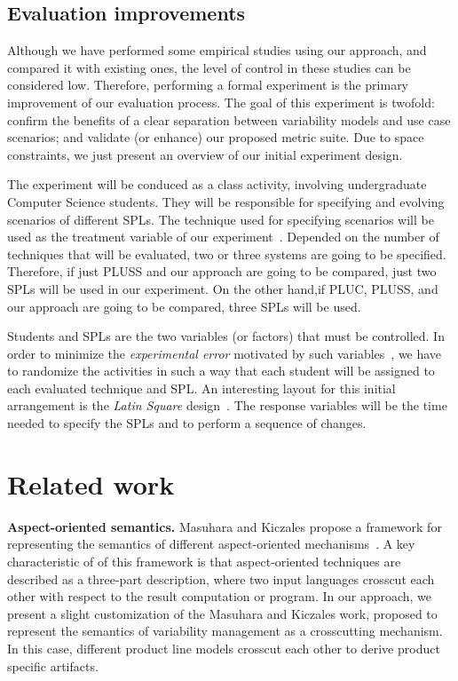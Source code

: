 \documentclass[times, 11pt,twocolumn]{article}
\begin{document}
\subsection{Evaluation improvements}\label{sub:eval-improvments}

Although we have performed some empirical studies using our approach, and
compared it with existing ones, the level of control in these studies can be
considered low. Therefore, performing a formal experiment is the primary
improvement of our evaluation process. The goal of this experiment is twofold:
confirm the benefits of a clear separation between variability models and use
case scenarios; and validate (or enhance) our proposed metric suite. Due to
space constraints, we just present an overview of our initial experiment design.

The experiment will be conduced as a class activity, involving undergraduate
Computer Science students. They will be responsible for specifying and evolving
scenarios of different SPLs. The technique used for specifying scenarios will be
used as the treatment variable of our experiment~\cite{Pfleeger:1994aa}.
Depended on the number of techniques that will be evaluated, two or three
systems are going to be specified. Therefore, if just PLUSS and our approach are
going to be compared, just two SPLs will be used in our experiment. On the other
hand,if PLUC, PLUSS, and our approach are going to be compared, three SPLs
will be used.

Students and SPLs are the two variables (or factors) that must be controlled. In
order to minimize the \emph{experimental error} motivated by such
variables~\cite{Pfleeger:1994aa}, we have to randomize the activities in such a
way that each student will be assigned to each evaluated technique and SPL. An
interesting layout for this initial arrangement is the \emph{Latin Square}
design~\cite{Box:2004aa}. The response variables will be the time needed to
specify the SPLs and to perform a sequence of changes.

\section{Related work}\label{sec:related}

{\bf Aspect-oriented semantics.} Masuhara and Kiczales propose a framework for
representing the semantics of different aspect-oriented
mechanisms~\cite{Masuhara:2003aa}. A key characteristic of of this framework is
that aspect-oriented techniques are described as a three-part description, where
two input languages crosscut each other with respect to the result computation or
program. In our approach, we present a slight customization of the Masuhara and
Kiczales work, proposed to represent the semantics of variability management as
a crosscutting mechanism. In this case, different product line models crosscut
each other to derive product specific artifacts.
\end{document}

